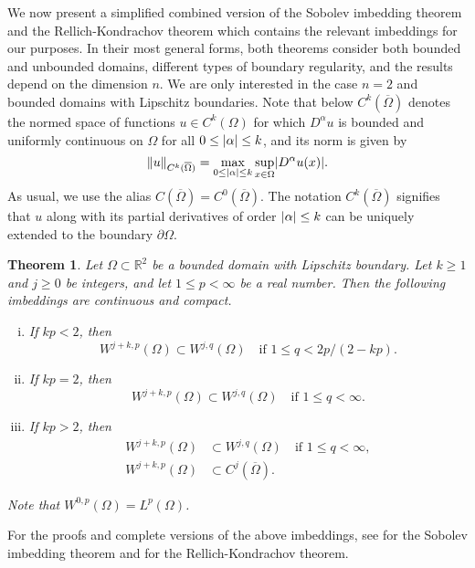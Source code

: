 \documentclass[english, 12pt, a4paper, sci, utf8, a-2b, online]{aaltothesis}
\theoremstyle{definition}
\theoremstyle{plain}
\newtheorem{theorem}{Theorem}[section]
\DeclarePairedDelimiter\abs{\lvert}{\rvert}
\DeclarePairedDelimiter\norm{\lVert}{\rVert}
\numberwithin{equation}{section}
\begin{document}
We now present a simplified combined version of the Sobolev imbedding
theorem and the Rellich-Kondrachov theorem which contains the relevant
imbeddings for our purposes. In their most general forms,
both theorems consider both bounded and unbounded domains,
different types of boundary regularity, and the results
depend on the dimension $n$. We are only interested in the
case $n=2$ and bounded domains with Lipschitz boundaries.
Note that below $C^k(\overline{\Omega})$ denotes the normed space of functions
$u \in C^k(\Omega)$ for which $D^{\alpha} u$ is bounded and uniformly
continuous on $\Omega$ for all $0 \leq \abs{\alpha} \leq k$,
and its norm is given by
\begin{equation*}
    \norm{u}_{C^k(\overline{\Omega})}
    = \max_{0 \leq \abs{\alpha} \leq k}
        \sup_{x \in \Omega} \abs{D^{\alpha} u(x)}.
\end{equation*}
As usual, we use the alias $C(\overline{\Omega}) = C^0(\overline{\Omega})$.
The notation $C^k(\overline{\Omega})$ signifies
that $u$ along with its partial derivatives of order
$\abs{\alpha} \leq k$ can be uniquely extended to the boundary $\partial \Omega$.
\begin{theorem}
    \label{thm:sobolevimbedding}
    Let $\Omega \subset \mathbb{R}^2$ be a bounded domain with Lipschitz boundary.
    Let $k \geq 1$ and $j \geq 0$ be integers, and let $1 \leq p < \infty$ be a
    real number. Then the following imbeddings are continuous and compact.
    \begin{enumerate}[(i)]
        \item If $kp < 2$, then
        \begin{equation*}
            W^{j+k,p}(\Omega) \subset W^{j,q}(\Omega)
            \quad \text{if } 1 \leq q < 2p/(2-kp) .
        \end{equation*}
        \item If $kp = 2$, then
        \begin{equation*}
            W^{j+k,p}(\Omega) \subset W^{j,q}(\Omega)
            \quad \text{if } 1 \leq q < \infty.
        \end{equation*}
        \item If $kp > 2$, then
        \begin{align*}
            W^{j+k,p}(\Omega) &\subset W^{j,q}(\Omega)
            \quad \text{if } 1 \leq q < \infty, \\
            W^{j+k,p}(\Omega) &\subset C^j(\overline{\Omega}).
        \end{align*}
    \end{enumerate}
    Note that $W^{0,p}(\Omega) = L^p(\Omega)$.
\end{theorem}
For the proofs and complete versions of the above imbeddings, see
\cite[Theorem 4.12 on p. 85]{adams2003} for the Sobolev imbedding theorem
and \cite[Theorem 6.3 on p. 168]{adams2003} for the Rellich-Kondrachov theorem.
\end{document}
